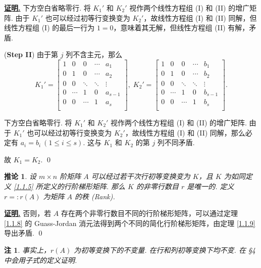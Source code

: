 \documentclass[10pt,openany]{article}
\theoremstyle{thmstyle} %
\theoremstyle{defstyle} %
\newtheorem{corollary}[theorem]{推论}
\theoremstyle{prostyle} %
\theoremstyle{exastyle}
\theoremstyle{remstyle}
\newtheorem{remark}[theorem]{注}
\renewenvironment{proof}[1][证明]{\par\underline{\textbf{#1.}} \;\fangsong}{\qed\par}
\begin{document}
\begin{proof}
	下方空白省略零行. 将 \( K_1' \) 和 \( K_2' \) 视作两个线性方程组 (I) 和 (II) 的增广矩阵. 由于 \( K_1' \) 也可以经过初等行变换变为 \( K_2' \)，故线性方程组 (I) 和 (II) 同解，但线性方程组 (I) 的最后一行为 \( 1=0 \)，意味着其无解，但线性方程组 (II) 有解，矛盾.
	
	(\textbf{Step II}) 由于第 \( j \) 列不含主元，那么
	\[ K_1'= \begin{bmatrix}
		1 & 0 & 0  & \cdots & a_1 \\
		0 & 1 & 0   & \cdots & a_2 \\
		0 & 0 & \ddots & \ddots & \vdots  \\
		0 &  \cdots & 1  & 0 & a_{s-1} \\
		0 & 0  & \cdots & 1 & a_s \\
		&  &  &  &   
	\end{bmatrix}, \; K_2'=\begin{bmatrix}
		1 & 0 & 0  & \cdots & b_1 \\
		0 & 1 & 0   & \cdots & b_2 \\
		0 & 0 & \ddots & \ddots & \vdots  \\
		0 &  \cdots & 1  & 0 & b_{s-1} \\
		0 & 0  & \cdots & 1 & b_s \\
		&  &  &  &   
	\end{bmatrix}. \]
	
	下方空白省略零行. 将 \( K_1' \) 和 \( K_2' \) 视作两个线性方程组 (I) 和 (II) 的增广矩阵. 由于 \( K_1' \) 也可以经过初等行变换变为 \( K_2' \)，故线性方程组 (I) 和 (II) 同解，那么必定有 \( a_i=b_i \ (1 \leq i \leq s) \). 这与 \( K_1 \) 和 \( K_2 \) 的第 \( j \) 列不同矛盾.
	
	故 \( K_1=K_2 \).
\end{proof}

\begin{corollary}
	设 \( m \times n \) 阶矩阵 \( A \) 可以经过若干次行初等变换变为 \( K \)，且 \( K \) 为如同定义 \ref{1.1.5} 所定义的行阶梯形矩阵. 那么 \( K \) 的非零行数目 \( r \) 是唯一的. 定义 \( r=:r(A) \) 为矩阵 \( A \) 的秩 (Rank). 
\end{corollary}

\begin{proof}
	否则，若 \( A \) 存在两个非零行数目不同的行阶梯形矩阵，可以通过定理 \ref{1.1.8} 的 Guass-Jordan 消元法得到两个不同的简化行阶梯形矩阵，由定理 \ref{1.1.9} 导出矛盾.
\end{proof}

\begin{remark}
	事实上，\( r(A) \) 为初等变换下的不变量. 在行和列初等变换下均不变. 在 \S 4 中会用子式的定义证明.
\end{remark}
\end{document}
